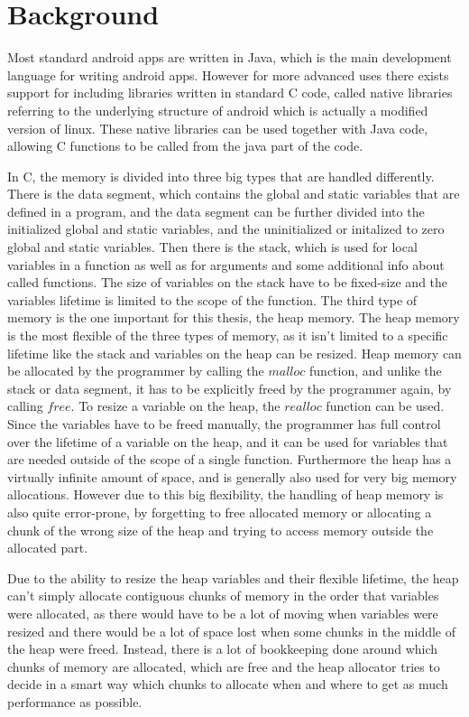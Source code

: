 \documentclass[a4paper,11pt,oneside]{report}
\begin{document}
\chapter{Background}

Most standard android apps are written in Java, which is the main development
language for writing android apps. However for more advanced uses there exists
support for including libraries written in standard C code, called native libraries
referring to the underlying structure of android which is actually a modified
version of linux. These native libraries can be used together with Java code,
allowing C functions to be called from the java part of the code.

In C, the memory is divided into three big types that are handled differently.
There is the data segment, which contains the global and static variables that
are defined in a program, and the data segment can be further divided into the
initialized global and static variables, and the uninitialized or initalized to
zero global and static variables.
Then there is the stack, which is used for local variables in a function as well
as for arguments and some additional info about called functions. The size of
variables on the stack have to be fixed-size and the variables lifetime is limited
to the scope of the function.
The third type of memory is the one important for this thesis, the heap memory.
The heap memory is the most flexible of the three types of memory, as it isn't
limited to a specific lifetime like the stack and variables on the heap can be
resized. Heap memory can be allocated by the programmer by calling the $malloc$
function, and unlike the stack or data segment, it has to be explicitly freed by
the programmer again, by calling $free$. To resize a variable on the heap, the
$realloc$ function can be used. Since the variables have to be freed manually,
the programmer has full control over the lifetime of a variable on the heap, and
it can be used for variables that are needed outside of the scope of a single
function. Furthermore the heap has a virtually infinite amount of space, and is
generally also used for very big memory allocations. However due to this big
flexibility, the handling of heap memory is also quite error-prone, by forgetting
to free allocated memory or allocating a chunk of the wrong size of the heap and
trying to access memory outside the allocated part.

Due to the ability to resize the heap variables and their flexible lifetime, the
heap can't simply allocate contiguous chunks of memory in the order that variables
were allocated, as there would have to be a lot of moving when variables were
resized and there would be a lot of space lost when some chunks in the middle of
the heap were freed. Instead, there is a lot of bookkeeping done around which
chunks of memory are allocated, which are free and the heap allocator tries to
decide in a smart way which chunks to allocate when and where to get as much
performance as possible.
\end{document}
